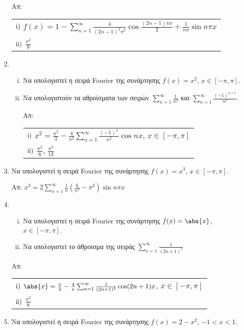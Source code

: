 \begin{enumerate}
	\hfill Απ: 
	\begin{tabular}{l}
		$ \rm i) $ $ f(x) = 1 - \sum_{n=1}^{\infty} \frac{4}{(2n-1)^{2} \pi ^{2}}
		\cos{\frac{(2n-1) \pi x}{2} + \frac{1}{n \pi} \sin{n \pi x}} $ \\
		$ \rm ii) $ $ \frac{\pi ^{2}}{8} $
	\end{tabular}	

\item
	\begin{enumerate}[i)]
		\item Να υπολογιστεί η σειρά \textlatin{Fourier} της συνάρτησης $ f(x)=x^{2} $, $ x \in [- \pi, \pi] $.
		\item Να υπολογιστούν τα αθροίσματα των σειρών $ \sum_{n=1}^{\infty} \frac{1}{n^{2}}  $ και
			$ \sum_{n=1}^{\infty} \frac{(-1)^{n+1}}{n^{2}}  $.

			\hfill Απ: \begin{tabular}{l} 
				$ \rm i) $ $ x^{2} = \frac{\pi ^{2}}{3} - \frac{4}{\pi ^{2}}\sum_{n=1}^{\infty}
				\frac{(-1)^{n}}{n^{2}} \cos{nx}  $, $ x \in [- \pi, \pi] $ \\
				$ \rm ii) $ $ \frac{\pi ^{2}}{6}  $, $ \frac{\pi ^{2}}{12}  $
	\end{tabular}
	\end{enumerate}

\item Να υπολογιστεί η σειρά \textlatin{Fourier} της συνάρτησης $ f(x)=x^{3} $, $ x \in [- \pi, \pi]
	$.

	\hfill Απ: $ x^{3} = 2 \sum_{n=1}^{\infty} \frac{1}{n} \left(\frac{6}{n^{2}} - \pi ^{2}\right) \sin{n \pi x} $ 

\item 
	\begin{enumerate}[i)]
		\item Να υπολογιστεί η σειρά \textlatin{Fourier} της συνάρτησης $ f(x)= \abs{x} $, $ x \in
			[- \pi, \pi] $. 
		\item Να υπολογιστεί το άθροισμα της σειράς $ \sum_{n=1}^{\infty} \frac{1}{(2n+1)^{2}} $ 
	\end{enumerate}

	\hfill Απ: \begin{tabular}{l}
		$\rm i)$ $ \abs{x} = \frac{\pi}{2} - \frac{4}{\pi} \sum_{n=1}^{\infty} \frac{1}{(2n+1)^{2}}
		\cos(2n+1)x  $, $ x \in [- \pi, \pi] $ \\
		$\rm ii)$ $ \frac{\pi ^{2}}{8}$ 
	\end{tabular}

\item Να υπολογιστεί η σειρά \textlatin{Fourier} της συνάρτησης $ f(x) = 2-x^{2} $, $ -1<x<1 $.


\end{enumerate}
